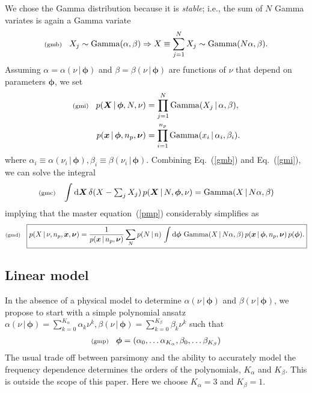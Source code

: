 \documentclass[11pt]{article}
\newcommand{\lleq}[1]{\label{#1} }
\renewcommand{\lleq}[1]{\label{#1} {\scriptstyle {\rm (#1)}} \hspace*{2ex} }
\newcommand{\cond}{\,|\,}
\newcommand{\bmx}{{{\bm{x}}}}
\newcommand{\bmX}{{\bm{X}}}
\newcommand{\bmphi}{{\bm{\phi}}}
\newcommand{\bmnu}{{\bm{\nu}}}
\newcommand{\refeq}[1]{Eq.~(\ref{#1})}
\DeclareMathOperator{\GammaDist}{Gamma}
\newcommand{\Kalpha}{{K_\alpha}}
\newcommand{\Kbeta}{{K_\beta}}
\newcommand{\npack}{n_p}
\newcommand{\rmdx}[1]{\mbox{d} #1 \,} %
\begin{document}
We chose the Gamma distribution because it is \emph{stable}; i.e.,
the sum of $N$ Gamma variates is again a Gamma variate
\begin{align}
  \lleq{gmb}
    X_j \sim \GammaDist(\alpha, \beta) \Rightarrow X \equiv \sum_{j=1}^N X_j \sim \GammaDist(N \alpha, \beta).
\end{align}
Assuming $\alpha = \alpha(\nu \cond \bmphi)$ and $\beta = \beta(\nu
\cond \bmphi)$ are functions of $\nu$ that depend on parameters
$\bmphi$, we set
\begin{align}
  \lleq{gmi}
  p(\bmX \cond \bmphi, N, \nu) &= \prod_{j=1}^N \GammaDist(X_j \cond \alpha, \beta ),\\
  p(\bmx \cond \bmphi, \npack, \bmnu) &= \prod_{i=1}^{\npack} \GammaDist(x_i \cond \alpha_i, \beta_i).
\end{align}
where $\alpha_i \equiv \alpha(\nu_i \cond \bmphi), \beta_i \equiv
\beta(\nu_i \cond \bmphi)$.  Combining \refeq{gmb} and \refeq{gmi}, we
can solve the integral
\begin{align}
  \lleq{gmc}
  \int \rmdx{\bmX} \delta(X - \textstyle\sum_j X_j)
  \,p(\bmX\cond N,\bmphi, \nu) = \GammaDist(X \cond N \alpha, \beta)
\end{align}
implying that the master equation~(\ref{pmp}) considerably simplifies
as
\begin{align}
  \lleq{gmd}
    \boxed{
    p(X\cond \nu, \npack,\bmx,\bmnu)
  = \frac{1}{p(\bmx\cond \npack, \bmnu)}
  \sum_N p(N\cond n)\, \int \rmdx{\bmphi} \GammaDist(X \cond N \alpha, \beta) %
  \, p(\bmx\cond \bmphi, \npack, \bmnu)
  \, p(\bmphi).
  }
\end{align}

\subsection{Linear model}

In the absence of a physical model to determine $\alpha(\nu \cond
\bmphi)$ and $\beta(\nu \cond \bmphi)$, we propose to start with a simple polynomial ansatz   $\alpha(\nu \cond \bmphi) = \sum_{k=0}^\Kalpha \alpha_k \nu^k, \beta(\nu \cond \bmphi) = \sum_{k=0}^\Kbeta \beta_k \nu^k$ such that
\begin{align}
  \lleq{gmp}
  \bmphi = (\alpha_0, \dots \alpha_\Kalpha , \beta_0, \dots \beta_\Kbeta)
\end{align}
The usual trade off between parsimony and the ability to accurately
model the frequency dependence determines the orders of the
polynomials, $\Kalpha$ and $\Kbeta$. This is outside the scope of this
paper. Here we choose $\Kalpha = 3$ and $\Kbeta = 1$.
\end{document}
